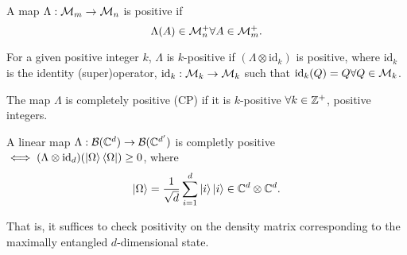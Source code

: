 \begin{defn}
    A map $\Lambda:\mathcal{M}_m\to \mathcal{M}_n$ is positive if
    \begin{equation}
        \Lambda(A)\in \mathcal{M}_n^+ \forall A \in \mathcal{M}_m^+.
    \end{equation}
\end{defn}
\begin{defn}
    For a given positive integer $k$, $\Lambda$ is $k$-positive if
    $(\Lambda \otimes \text{id}_k)$ is positive, where $\text{id}_k$ is the identity (super)operator, $\text{id}_k:\mathcal{M}_k \to \mathcal{M}_k$ such that $\text{id}_k(Q)=Q \forall Q\in \mathcal{M}_k$.
\end{defn}
\begin{defn}
    The map $\Lambda$ is completely positive (CP) if it is $k$-positive $\forall k\in \mathbb{Z}^+$, positive integers.
\end{defn}
\begin{thm}
    A linear map $\Lambda:\mathcal{B}(\mathbb{C}^d)\to \mathcal{B}(\mathbb{C}^{d'})$ is completly positive $\iff (\Lambda \otimes \text{id}_d)(\left| \Omega \right>\left< \Omega \right|)\geq 0$, where
    \begin{equation}
        \left| \Omega \right>=\frac{1}{\sqrt{d}}\sum_{i=1}^d \left| i \right>\left| i \right> \in \mathbb{C}^d \otimes \mathbb{C}^d.
    \end{equation}
\end{thm}
That is, it suffices to check positivity on the density matrix corresponding to the maximally entangled $d$-dimensional state.
